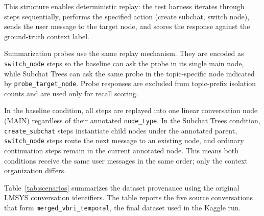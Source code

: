 \documentclass[pdflatex,sn-mathphys-num]{sn-jnl}%
\theoremstyle{thmstyleone}%
\theoremstyle{thmstyletwo}%
\theoremstyle{thmstylethree}%
\begin{document}
This structure enables deterministic replay: the test harness iterates through steps sequentially, performs the specified action (create subchat, switch node), sends the user message to the target node, and scores the response against the ground-truth context label.

Summarization probes use the same replay mechanism. They are encoded as \texttt{switch\_node} steps so the baseline can ask the probe in its single main node, while Subchat Trees can ask the same probe in the topic-specific node indicated by \texttt{probe\_target\_node}. Probe responses are excluded from topic-prefix isolation counts and are used only for recall scoring.

In the baseline condition, all steps are replayed into one linear conversation node (MAIN) regardless of their annotated \texttt{node\_type}. In the Subchat Trees condition, \texttt{create\_subchat} steps instantiate child nodes under the annotated parent, \texttt{switch\_node} steps route the next message to an existing node, and ordinary continuation steps remain in the current annotated node. This means both conditions receive the same user messages in the same order; only the context organization differs.

Table~\ref{tab:scenarios} summarizes the dataset provenance using the original LMSYS conversation identifiers. The table reports the five source conversations that form \texttt{merged\_vbri\_temporal}, the final dataset used in the Kaggle run.
\end{document}
